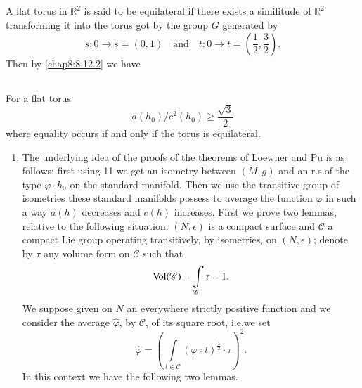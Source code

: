 \setcounter{subsection}{2}

\subsection{}\label{chap8:8.12.3}

\begin{defi*}
A flat torus in $\mathbb{R}^{2}$ is said to be equilateral if there
exists a similitude of $\mathbb{R}^{2}$ transforming it into the torus
got by the group $G$ generated by
$$
s:0\to s=(0,1)\quad\text{and}\quad t:0\to
t=\left(\frac{1}{2},\frac{3}{2}\right). 
$$
Then by \eqref{chap8:8.12.2} we have
\end{defi*}

\subsection{}\label{chap8:8.12.4}

\begin{lemma*}
For a flat torus
$$
a(h_{0})/c^{2}(h_{0})\geq \dfrac{\sqrt{3}}{2}
$$
where equality occurs if and only if the torus is equilateral.
\end{lemma*}

\begin{enumerate}
\renewcommand{\theenumi}{\Alph{enumi}}
\renewcommand{\labelenumi}{\theenumi)}
\setcounter{enumi}{2}
\item The underlying idea of the proofs of the theorems of Loewner and
  Pu is as follows: first using 11 we get an isometry between $(M,g)$
  and an r.s.\@ of the type $\varphi\cdot h_{0}$ on the standard
  manifold. Then we use the transitive group of isometries these
  standard manifolds possess to average the function $\varphi$ in such
  a way $a(h)$ decreases and $c(h)$ increases. First \pageoriginale we prove two
  lemmas, relative to the following situation: $(N,\epsilon)$ is a
  compact surface and $\mathscr{C}$ a compact Lie group operating
  transitively, by isometries, on $(N,\epsilon)$; denote by $\tau$ any
  volume form on $\mathscr{C}$ such that
$$
\operatorname{Vol}(\mathscr{C})=\int\limits_{\mathscr{C}}\tau=1.
$$
We suppose given on $N$ an everywhere strictly positive function and
we consider the average $\widehat{\varphi}$, by $\mathscr{C}$, of its
square root, i.e.\@ we set
$$
\widehat{\varphi}=\left(\int\limits_{t\in\mathscr{C}}(\varphi\circ
t)^{\frac{1}{2}}\cdot\tau\right)^{2}. 
$$
In this context we have the following two lemmas.
\end{enumerate}

